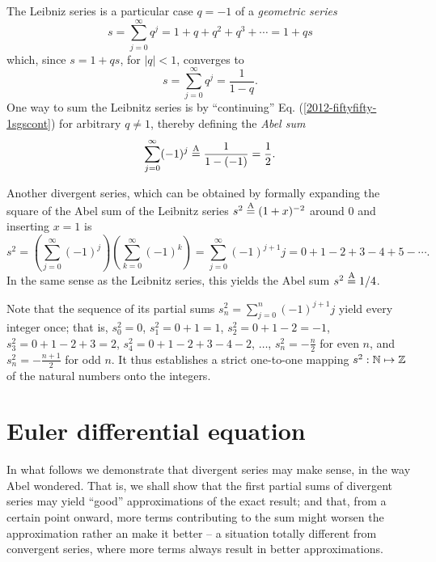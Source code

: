 The Leibniz series is a particular case $q=-1$ of a {\em geometric series}
\begin{equation}
s = \sum_{j=0}^\infty q^j=1+q+q^2+q^3+ \cdots  =1+q s
\label{2009-fiftyfifty-1sgs}
\end{equation}
which, since $s=1+qs$, for $\vert q\vert <1$, converges  to
\begin{equation}
s= \sum_{j=0}^\infty q^j= \frac{1}{1-q}.
\label{2012-fiftyfifty-1sgscont}
\end{equation}
One way to sum the Leibnitz series is by ``continuing''
Eq. (\ref{2012-fiftyfifty-1sgscont})
for arbitrary $q\neq 1$, thereby defining the
{\em Abel sum}
\begin{equation}
\sum_{j=0}^\infty (-1)^j \stackrel{{\rm A}}{=} \frac{1}{1-(-1)} = \frac{1}{2}.
\label{2012-fiftyfifty-1sgscont1}
\end{equation}

Another divergent series,
which can be obtained by formally expanding  the square of the Abel sum of the
Leibnitz series $s^2 \stackrel{{\rm A}}{=} (1+x)^{-2}$
around $0$ and inserting $x=1$
\cite{Kline-83}
is
\begin{equation}
s^2  =
\left(\sum_{j=0}^\infty (-1)^j\right)
\left(\sum_{k=0}^\infty (-1)^k\right)
= \sum_{j=0}^\infty (-1)^{j+1} j = 0 + 1-2+3-4+5-\cdots
.
\label{2009-fiftyfifty-1s1}
\end{equation}
In the same sense as the Leibnitz series, this yields the Abel sum $s^2\stackrel{{\rm A}}{=}1/4$.


Note that the sequence of its partial sums $s^2_n=\sum_{j=0}^n (-1)^{j+1} j $
yield every integer once; that is,
$s^2_0 =0$,
$s^2_1 =0+1=1$,
$s^2_2 =0+1-2=-1$,
$s^2_3 =0+1-2+3=2$,
$s^2_4 =0+1-2+3-4-2$,
$\ldots$,
$s^2_n =-\frac{n}{2}$ for even $n$,
and
$s^2_n =-\frac{n+1}{2}$ for odd $n$.
It thus establishes a strict one-to-one mapping
$s^2: {\Bbb N} \mapsto {\Bbb Z}$
of the natural numbers onto the integers.


\section{Euler differential equation}

In what follows we demonstrate that divergent series may make sense, in the way Abel
wondered.
That is, we shall show that the first partial sums of divergent series
may yield ``good'' approximations of the exact result; and
that, from a certain point onward, more terms contributing to the
sum  might worsen the approximation rather an make it better -- a situation totally different
from convergent series, where more terms always result in better approximations.

